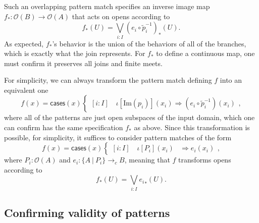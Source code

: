 \documentclass[conference]{IEEEtran}
\newcommand{\cto}{\to_c}
\newcommand{\suchthat}{\ |\ }
\newcommand{\Open}[1]{\mathcal{O}({#1})}
\newcommand{\Img}[1]{\text{Im}\left({#1}\right)}
\newcommand{\oinclf}[1]{\iota[{#1}]}
\newcommand{\oincl}[2]{\oinclf{#1} \left({#2}\right)}
\newcommand{\Branch}{\Rightarrow}
\begin{document}
Such an overlapping pattern match specifies an inverse image map $f_* : \Open{B} \to \Open{A}$ that acts on opens according to
\[
f_*(U) = \bigvee_{i : I} (e_i \circ \tilde{p}_i^{-1})_*(U).
\]
As expected, $f_*$'s behavior is the union of the behaviors of all of the branches, which is exactly what the join represents. For $f_*$ to define a continuous map, one must confirm it preserves all joins and finite meets.

For simplicity, we can always transform the pattern match defining $f$ into an equivalent one
\[
f(x) = \mathsf{cases}(x)
\begin{cases}
[i : I] \quad \oincl{\Img{p_i}}{x_i} \Branch (e_i \circ \tilde{p}_i^{-1})(x_i)
\end{cases},
\]
where all of the patterns are just open subspaces of the input domain, which one can confirm has the same specification $f_*$ as above. Since this transformation is possible, for simplicity, it suffices to consider pattern matches of the form
\[
f(x) = \mathsf{cases}(x)
\begin{cases}
[i : I] \quad \oincl{P_i}{x_i} &\Branch e_i(x_i)
\end{cases},
\]
where $P_i : \Open{A}$ and $e_i : \{ A \suchthat P_i \} \cto B$, meaning that $f$ transforms opens according to
\[
f_*(U) = \bigvee_{i : I} {e_i}_*(U).
\]

\subsection{Confirming validity of patterns}
\end{document}

